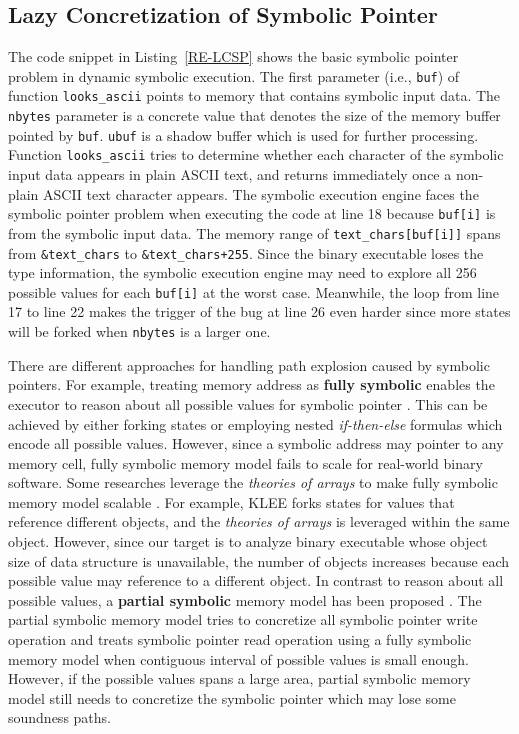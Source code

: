 \documentclass{cta-author}
\begin{document}
\subsection{Lazy Concretization of Symbolic Pointer}
The code snippet in Listing~\ref{RE-LCSP} shows the basic symbolic pointer 
problem in dynamic symbolic execution. The first parameter 
(i.e., \texttt{buf}) of function \texttt{looks\_ascii} points to memory 
that contains symbolic input data. The \texttt{nbytes} parameter is a 
concrete value that denotes the size of the memory buffer pointed by 
\texttt{buf}. \texttt{ubuf} is a shadow buffer which is used for further 
processing. 
Function \texttt{looks\_ascii} tries to determine whether each character 
of the symbolic input data appears in plain ASCII text, and returns 
immediately once a non-plain ASCII text character appears. 
The symbolic execution engine faces the symbolic pointer problem when executing 
the code at line 18 because \texttt{buf[i]} is from the symbolic input data. 
The memory range of \texttt{text\_chars[buf[i]]} spans from \texttt{\&text\_chars} 
to \texttt{\&text\_chars+255}. Since the binary executable loses the 
type information, the symbolic execution engine may need to explore all 256 possible
values for each \texttt{buf[i]} at the worst case. Meanwhile, the loop from line
17 to line 22 makes the trigger of the bug at line 26 even harder since more
states will be forked when \texttt{nbytes} is a larger one.

There are different approaches for handling path explosion caused by
symbolic pointers. For example, treating memory address as \textbf{fully symbolic} 
enables the executor to reason about all possible values for symbolic pointer
\cite{song2008bitblaze, thakur2010directed, brumley2011bap, trtik2014symbolic}.
This can be achieved by either forking states or employing nested 
\textit{if-then-else} formulas which encode all possible values. 
However, since a symbolic address may pointer to any memory cell, fully symbolic
memory model fails to scale for real-world binary software. 
Some researches leverage the \textit{theories of arrays} to make fully symbolic 
memory model scalable \cite{cadar2006exe}\cite{cadar2008klee}. 
For example, KLEE \cite{cadar2008klee} forks states for values that reference 
different objects, and the \textit{theories of arrays} is leveraged within the same object.
However, since our target is to analyze binary executable whose object size of data structure is 
unavailable, the number of objects increases because each possible value may reference to a 
different object.
In contrast to reason about all possible values, a \textbf{partial symbolic} memory model has been proposed \cite{cha2012unleashing, avgerinos2014exploiting, Shoshitaishvili_firmalice-automatic}.  
The partial symbolic memory model tries to concretize all symbolic pointer write 
operation and treats symbolic pointer read operation using a fully 
symbolic memory model when contiguous interval of possible values is small enough.
However, if the possible values spans a large area, partial symbolic memory model
still needs to concretize the symbolic pointer which may lose some soundness paths.
\end{document}
